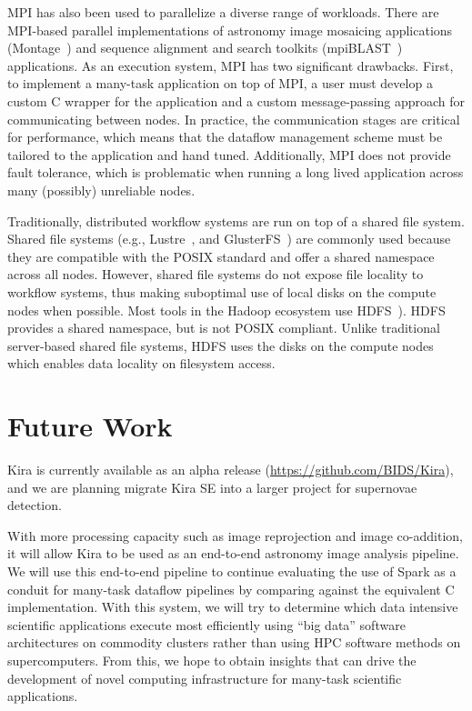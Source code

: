 \documentclass[10pt,journal,compsoc]{IEEEtran}
\begin{document}
MPI has also been used to parallelize a diverse range of workloads. There
are MPI-based parallel implementations of astronomy image
mosaicing applications (Montage~\cite{jacob09}) and
sequence alignment and search toolkits (mpiBLAST~\cite{lin08}) applications. As an
execution system, MPI has two significant drawbacks. First, to implement a many-task
application on top of MPI, a user must develop a custom C wrapper for the application
and a custom message-passing approach for communicating between nodes. In practice, the
communication stages are critical for performance, which means that the
dataflow management scheme must be tailored to the application and hand tuned. Additionally,
MPI does not provide fault tolerance, which is problematic when running a long lived
application across many (possibly) unreliable nodes.

Traditionally, distributed workflow systems are run on top of a shared file system. 
Shared file systems (e.g., Lustre~\cite{donovan03}, and
GlusterFS~\cite{davies13}) are commonly used because they are compatible with the POSIX
standard and offer a shared namespace across all nodes. However, shared file systems
do not expose file locality to workflow systems, thus making suboptimal use of local
disks on the compute nodes when possible. Most tools in the Hadoop ecosystem use
HDFS~\cite{shvachko10}). HDFS  provides a shared namespace, but is not POSIX
compliant. Unlike traditional server-based shared file systems, HDFS uses
the disks on the compute nodes which enables data locality on filesystem access.

\section{Future Work}
\label{sec:Future}
Kira is currently available as an alpha release (\url{https://github.com/BIDS/Kira}), 
and we are planning migrate Kira SE into a larger project for supernovae detection.

With more processing capacity such as image reprojection and image co-addition, it will allow Kira to be
used as an end-to-end astronomy image analysis pipeline. We will use this end-to-end pipeline
to continue evaluating the use of Spark as a conduit for many-task dataflow pipelines by
comparing against the equivalent C implementation. With this system, we will try to determine
which data intensive scientific applications execute most efficiently using ``big data''
software architectures on commodity clusters rather than using HPC software methods on supercomputers.
From this, we hope to obtain insights that can drive the development of novel computing
infrastructure for many-task scientific applications.
\end{document}
